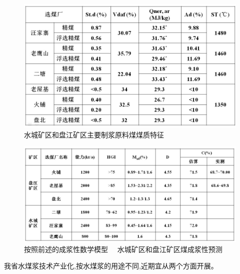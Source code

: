 \documentclass[10pt,openany]{ctexbook}
\begin{document}
    \begin{figure}[!ht]
\includegraphics[scale=0.6]{34}
\caption{水城矿区和盘江矿区主要制浆原料煤煤质特征 }
\end{figure}

    \begin{figure}[!ht]
\includegraphics[scale=0.6]{35}
\caption{按照前述的成浆性数学模型~~ 水城矿区和盘江矿区煤成浆性预测}
\end{figure}
我省水煤浆技术产业化,按水煤浆的用途不同,近期宜从两个方面开展。
\end{document}
